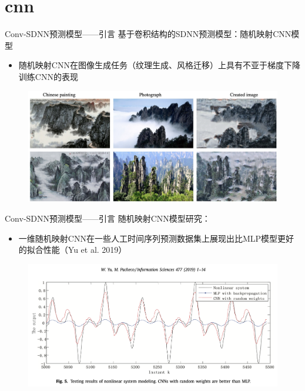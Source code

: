 \section{cnn}
\begin{frame}{Conv-SDNN预测模型——引言}
    基于卷积结构的SDNN预测模型：随机映射CNN模型
    \begin{itemize}
        \item 随机映射CNN在图像生成任务（纹理生成、风格迁移）上具有不亚于梯度下降训练CNN的表现
    \end{itemize}
    \vspace*{-0.5em}
    \begin{figure}
        \centering
        \includegraphics[width=0.9\linewidth]{float/ch.cnn/ranVGG.png}
    \end{figure}
\end{frame}

\begin{frame}{Conv-SDNN预测模型——引言}
    随机映射CNN模型研究：
    \begin{itemize}
        \item 一维随机映射CNN在一些人工时间序列预测数据集上展现出比MLP模型更好的拟合性能（Yu et al. 2019）
    \end{itemize}
    \vspace*{-0.5em}
    \begin{figure}
        \centering
        \includegraphics[width=0.9\linewidth]{float/ch.cnn/yu.png}
    \end{figure}
\end{frame}

